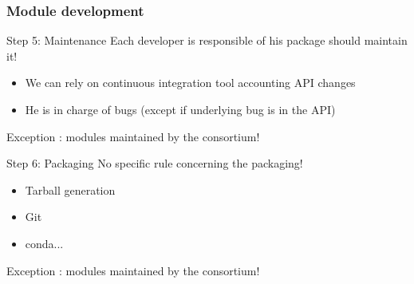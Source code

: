 \documentclass[8pt]{beamer}
\begin{document}
\begin{frame}
  \frametitle{Module development}
  \begin{block}{Step 5: Maintenance}
    Each developer is responsible of his package should maintain it!
    \begin{itemize}
    \item We can rely on continuous integration tool accounting API changes
    \item He is in charge of bugs (except if underlying bug is in the API)
    \end{itemize}
    Exception : modules maintained by the consortium!
  \end{block}
  
  \begin{block}{Step 6: Packaging}
    No specific rule concerning the packaging!
    \begin{itemize}
    \item Tarball generation
    \item Git
    \item conda...
    \end{itemize}
    Exception : modules maintained by the consortium!
  \end{block}
\end{frame}
\end{document}
